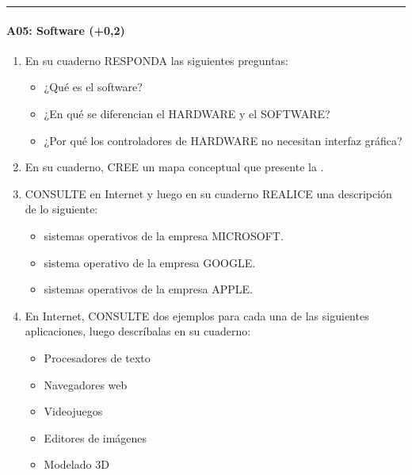 \documentclass[letterpaper,10pt,spanish]{sphinxmanual}
\begin{document}
\bigskip\hrule\bigskip



\paragraph{A05: Software (+0,2)}
\label{\detokenize{cursos/logica8/periodo01/G01:a05-software-0-2}}
\sphinxAtStartPar
{}
\begin{enumerate}
%
\item {} 
\sphinxAtStartPar
En su cuaderno RESPONDA las siguientes preguntas:
\begin{itemize}
\item {} 
\sphinxAtStartPar
¿Qué es el software?

\item {} 
\sphinxAtStartPar
¿En qué se diferencian el HARDWARE y el SOFTWARE?

\item {} 
\sphinxAtStartPar
¿Por qué los controladores de HARDWARE no necesitan interfaz gráfica?

\end{itemize}

\item {} 
\sphinxAtStartPar
En su cuaderno, CREE un mapa conceptual que presente la .

\item {} 
\sphinxAtStartPar
CONSULTE en Internet y luego en su cuaderno REALICE una descripción de lo siguiente:
\begin{itemize}
\item {} 
 sistemas operativos de la empresa MICROSOFT.

\item {} 
 sistema operativo de la empresa GOOGLE.

\item {} 
 sistemas operativos de la empresa APPLE.

\end{itemize}

\item {} 
\sphinxAtStartPar
En Internet, CONSULTE dos ejemplos para cada una de las siguientes aplicaciones, luego descríbalas en su cuaderno:
\begin{itemize}
\item {} 
\sphinxAtStartPar
Procesadores de texto

\item {} 
\sphinxAtStartPar
Navegadores web

\item {} 
\sphinxAtStartPar
Videojuegos

\item {} 
\sphinxAtStartPar
Editores de imágenes

\item {} 
\sphinxAtStartPar
Modelado 3D

\end{itemize}

\end{enumerate}
\end{document}
